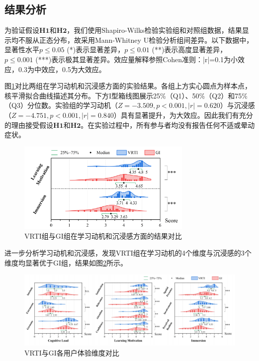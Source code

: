 \documentclass[runningheads]{llncs}
\begin{document}
\subsection{结果分析}

为验证假设$\textbf{H1}$和$\textbf{H2}$，我们使用Shapiro-Wilks检验实验组和对照组数据，结果显示均不服从正态分布，故采用Mann-Whitney U检验分析组间差异。以下数据中，显著性水平$p \le 0.05$ (*)表示显著差异，$p \le 0.01$ (**)表示高度显著差异，$p \le 0.001$ (***)表示极其显著差异。效应量解释参照Cohen准则：|r|=0.1为小效应，0.3为中效应，0.5为大效应。

图\ref{fig:user-experience-result}对比两组在学习动机和沉浸感方面的实验结果。各组上方实心圆点为样本点，核平滑拟合曲线描述其分布。下方I型箱线图展示25\%（Q1）、50\%（Q2）和75\%（Q3）分位数。实验组的学习动机（$Z=-3.509,p<0.001,|r|=0.620$）与沉浸感（$Z=-4.751,p<0.001,|r|=0.840$）具有显著提升，为大效应。因此我们有充分的理由接受假设$\textbf{H1}$和$\textbf{H2}$。在实验过程中，所有参与者均没有报告任何不适或晕动症状。

\begin{figure}[t]
  \centering
  \includegraphics[width=0.75\textwidth]{image/user-experience-result.pdf}
  \caption{VRTI组与GI组在学习动机和沉浸感方面的结果对比}
  \label{fig:user-experience-result}
\end{figure}

进一步分析学习动机和沉浸感，发现VRTI组在学习动机的4个维度与沉浸感的3个维度均显著优于GI组，结果如图\ref{fig:three-user-experience-result}所示。

\begin{figure}[t]
  \centering
  \includegraphics[width=\textwidth]{image/three-user-experience-result.pdf}
  \caption{VRTI与GI各用户体验维度对比}
  \label{fig:three-user-experience-result}
\end{figure}
\end{document}
